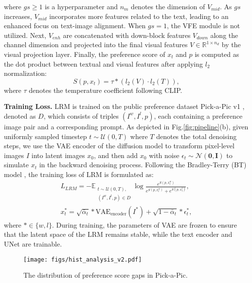 where $gs\ge 1$ is a hyperparameter and $n_m$ denotes the dimension of $V_{mid}$. As $gs$ increases, $V_{mid}$ incorporates more features related to the text, leading to an enhanced focus on text-image alignment. When $gs=1$, the VFE module is not utilized. Next, $V_{enh}$ are concatenated with down-block features $V_{down}$ along the channel dimension and projected into the final visual features $V\in\mathbb{R}^{1\times n_d}$ by the visual projection layer. Finally, the preference score of $x_t$ and $p$ is computed as the dot product between textual and visual features after applying $l_2$ normalization:
\begin{equation}
    S(p, x_t)=\tau*(l_2(V)\cdot l_2(T)),
    \label{eq:score}
\end{equation}
where $\tau$ denotes the temperature coefficient following CLIP.


\textbf{Training Loss.} LRM is trained on the public preference dataset Pick-a-Pic v1 \cite{pickscore}, denoted as $D$, which consists of triples $(I^w, I^l, p)$, each containing a preference image pair and a corresponding prompt. As depicted in Fig.\;\ref{fig:pipeline}\;(b), given uniformly sampled timestep $t \sim \mathcal{U}(0,T)$ where $T$ denotes the total denoising steps, we use the VAE encoder of the diffusion model to transform pixel-level images $I$ into latent images $x_0$, and then add $x_0$ with noise $\epsilon_t \sim \mathcal{N}(\mathbf{0},\mathbf{I})$ to simulate $x_t$ in the backward denoising process. Following the Bradley-Terry (BT) model \cite{bt}, the training loss of LRM is formulated as:
\begin{gather}
    L_{LRM} = - \mathbb{E}_{\substack{t\sim\mathcal{U}(0,T),\\ (I^w,I^l,p)\in D}}\log \frac{e^{S(p,x_t^w)}}{e^{S(p,x_t^w)}+e^{S(p,x_t^l)}},
    \label{eq:loss_lrm}  \\
    x_t^*=\sqrt{\bar{\alpha}_t} * \text{VAE}_{\text{encoder}}(I^*)+\sqrt{1-\bar{\alpha}_t}*\epsilon_t^*,
\end{gather}
where $*\in\{w,l\}$. During training, the parameters of VAE are frozen to ensure that the latent space of the LRM remains stable, while the text encoder and UNet are trainable.

\begin{figure}[t]
    \centering
    \texttt{[image: figs/hist\_analysis\_v2.pdf]}
    \vspace{-24pt}
    \caption{The distribution of preference score gaps in Pick-a-Pic.}
    \label{fig:hist_anslysis}
    \vspace{-10pt}
\end{figure}

